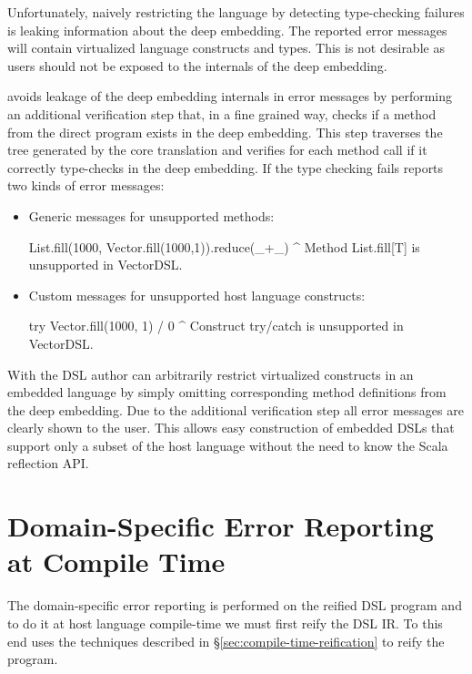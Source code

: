 Unfortunately, naively restricting the language by detecting type-checking
failures is leaking information about the deep embedding. The reported error
messages will contain virtualized language constructs and types. This is not desirable
as users should not be exposed to the internals of the deep embedding.

\yy avoids leakage of the deep embedding internals in error messages by performing an
additional verification step that, in a fine grained way, checks if a method
from the direct program exists in the deep embedding. This step traverses the
tree generated by the core translation and verifies for each method call if it
correctly type-checks in the deep embedding. If the type checking fails \yy
reports two kinds of error messages:

\begin{itemize}
\item Generic messages for unsupported methods:\begin{lstparagraph}
List.fill(1000, Vector.fill(1000,1)).reduce(_+_)
^
Method List.fill[T] is unsupported in VectorDSL.
\end{lstparagraph}

\item Custom messages for unsupported host language constructs:\begin{lstparagraph}
try Vector.fill(1000, 1) / 0
^
Construct try/catch is unsupported in VectorDSL.
\end{lstparagraph}
\end{itemize}
%
With \yy the DSL author can arbitrarily restrict virtualized constructs in an
embedded language by simply omitting corresponding method definitions from the
deep embedding. Due to the additional verification step all error messages are
clearly shown to the user. This allows easy construction of embedded DSLs that
support only a subset of the host language without the need to know the Scala
reflection API.

\section{Domain-Specific Error Reporting at Compile Time}
\label{sec:domain-specific-error-reporting}

The domain-specific error reporting is performed on the reified DSL program and to do it
at host language compile-time we must first reify the DSL IR. To this end \yy uses
the techniques described in \S \ref{sec:compile-time-reification} to reify the program.



